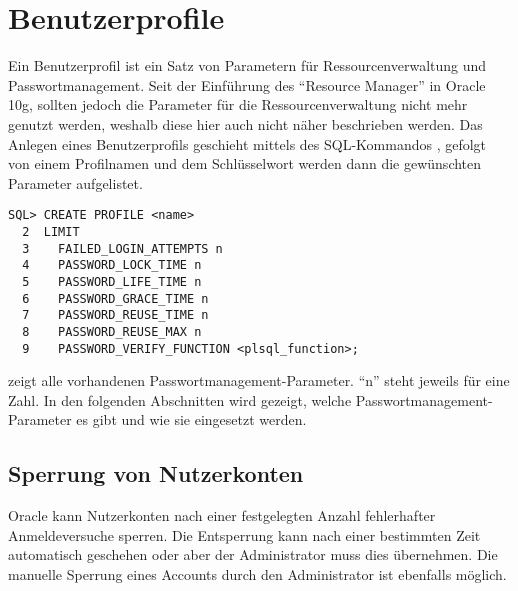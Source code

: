    \section{Benutzerprofile}
      \label{userprofiles}
      Ein Benutzerprofil ist ein Satz von Parametern f\"ur Ressourcenverwaltung
      und Passwortmanagement. Seit der Einf\"uhrung des \enquote{Resource
      Manager} in Oracle 10g, sollten jedoch die Parameter f\"ur die
      Ressourcenverwaltung nicht mehr genutzt werden, weshalb diese hier auch
      nicht n\"aher beschrieben werden. Das Anlegen eines Benutzerprofils
      geschieht mittels des SQL-Kommandos ,
      gefolgt von einem Profilnamen und dem Schl\"usselwort
       werden dann die gew\"unschten Parameter
      aufgelistet.
        \begin{lstlisting}[caption={Anzahl fehlerhafter Anmeldeversuche
        konfigurieren},label=admin216,language=oracle_sql]
SQL> CREATE PROFILE <name>
  2  LIMIT
  3    FAILED_LOGIN_ATTEMPTS n
  4    PASSWORD_LOCK_TIME n
  5    PASSWORD_LIFE_TIME n
  6    PASSWORD_GRACE_TIME n
  7    PASSWORD_REUSE_TIME n
  8    PASSWORD_REUSE_MAX n
  9    PASSWORD_VERIFY_FUNCTION <plsql_function>;
        \end{lstlisting}
         zeigt alle vorhandenen Passwortmanagement-Parameter. \enquote{n} steht jeweils f\"ur eine Zahl. In den folgenden Abschnitten wird gezeigt, welche Passwortmanagement-Parameter es gibt und wie sie eingesetzt werden.
      \subsection{Sperrung von Nutzerkonten}
        Oracle kann Nutzerkonten nach einer festgelegten Anzahl fehlerhafter Anmeldeversuche sperren. Die Entsperrung kann nach einer bestimmten Zeit automatisch geschehen oder aber der Administrator muss dies \"ubernehmen. Die manuelle Sperrung eines Accounts durch den Administrator ist ebenfalls m\"oglich.

